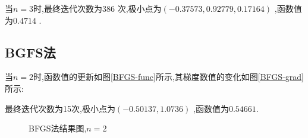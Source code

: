     当$ n=3 $时,最终迭代次数为$ 386 $ 次,极小点为$ (-0.37573,0.92779,0.17164) $ ,函数值为$ 0.4714 $ .

    \subsection{BGFS法}
    当$ n=2 $时,函数值的更新如图\ref{BFGS-func}所示,其梯度数值的变化如图\ref{BFGS-grad}所示:
    \par
    最终迭代次数为15次,极小点为$ (-0.50137,1.0736) $ ,函数值为$ 0.54661. $ 
    \begin{figure}[htbp!]
        \centering
        \caption{BFGS法结果图,$ n=2 $ }
    \end{figure}

